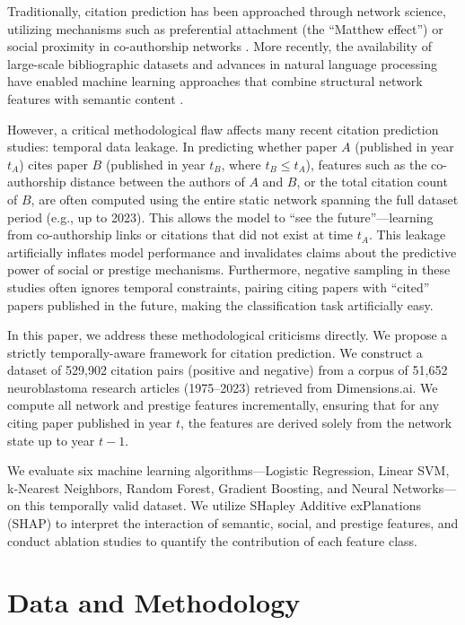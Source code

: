 \documentclass[11pt,a4paper]{article}
\begin{document}
Traditionally, citation prediction has been approached through network science, utilizing mechanisms such as preferential attachment (the ``Matthew effect'') \citep{Barabasi1999, Merton1968} or social proximity in co-authorship networks \citep{Newman2001}. More recently, the availability of large-scale bibliographic datasets and advances in natural language processing have enabled machine learning approaches that combine structural network features with semantic content \citep{Chakraborty2015, Shibata2012}.

However, a critical methodological flaw affects many recent citation prediction studies: temporal data leakage. In predicting whether paper $A$ (published in year $t_A$) cites paper $B$ (published in year $t_B$, where $t_B \le t_A$), features such as the co-authorship distance between the authors of $A$ and $B$, or the total citation count of $B$, are often computed using the entire static network spanning the full dataset period (e.g., up to 2023). This allows the model to ``see the future''—learning from co-authorship links or citations that did not exist at time $t_A$. This leakage artificially inflates model performance and invalidates claims about the predictive power of social or prestige mechanisms. Furthermore, negative sampling in these studies often ignores temporal constraints, pairing citing papers with ``cited'' papers published in the future, making the classification task artificially easy.

In this paper, we address these methodological criticisms directly. We propose a strictly temporally-aware framework for citation prediction. We construct a dataset of 529,902 citation pairs (positive and negative) from a corpus of 51,652 neuroblastoma research articles (1975--2023) retrieved from Dimensions.ai. We compute all network and prestige features incrementally, ensuring that for any citing paper published in year $t$, the features are derived solely from the network state up to year $t-1$.

We evaluate six machine learning algorithms—Logistic Regression, Linear SVM, k-Nearest Neighbors, Random Forest, Gradient Boosting, and Neural Networks—on this temporally valid dataset. We utilize SHapley Additive exPlanations (SHAP) to interpret the interaction of semantic, social, and prestige features, and conduct ablation studies to quantify the contribution of each feature class.

\section{Data and Methodology}
\end{document}
